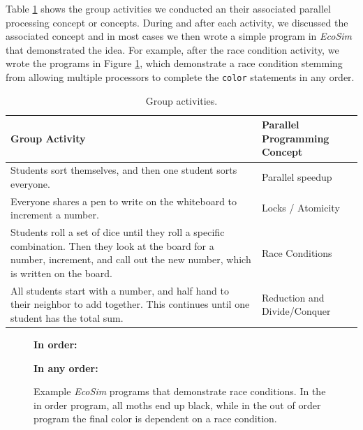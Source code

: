 \documentclass{sig-alternate}
\newcommand{\INDSTATE}[1][1]{\STATE\hspace{#1\algorithmicindent}}
\begin{document}
Table \ref{tab:group-activities} shows the group activities we conducted an their associated
parallel processing concept or concepts.  During and after each activity, we discussed the
associated concept and in most cases we then wrote a simple program in \emph{EcoSim} that
demonstrated the idea.
For example, after the race condition activity, we wrote the programs in Figure 
\ref{fig:race-conditions}, which demonstrate a race condition stemming from allowing multiple
processors to complete the \texttt{color} statements in any order.

\begin{table}
\centering \begin{tabular}{p{11cm} | p{5cm}} 
\toprule
Group Activity               &  Parallel Programming Concept \\ \midrule
Students sort themselves, and then one student sorts everyone.     & Parallel speedup \\ \hline
Everyone shares a pen to write on the whiteboard to increment a number. & Locks / Atomicity  \\ \hline
Students roll a set of dice until they roll a specific combination.  Then they
look at the board for a number, increment, and call out the new number, which is
written on the board.  & Race Conditions \\ \hline
All students start with a number, and half hand to their neighbor to add together.
This continues until one student has the total sum. & Reduction and Divide/Conquer  \\
\bottomrule 
\end{tabular}
\caption{Group activities.}
\label{tab:group-activities}
\end{table} 
     
\begin{figure}
\begin{algorithmic}[1]
\item[{\bf In order:}]
  \INDSTATE{a position}
  \INDSTATE{a color}
\STATE{}
  \INDSTATE{do in order}
  \INDSTATE[2]{replace the moth's color with gray}
  \INDSTATE[2]{replace the moth's color with black}
\end{algorithmic}

\begin{algorithmic}[1]
\item[{\bf In any order:}]
  \INDSTATE{a position}
  \INDSTATE{a color}
\STATE{}
  \INDSTATE{do in any order}
  \INDSTATE[2]{replace the moth's color with gray}
  \INDSTATE[2]{replace the moth's color with black}
\end{algorithmic} 
\caption{Example \emph{EcoSim} programs that demonstrate race conditions.  In the
in order program, all moths end up black, while in the out of order program
the final color is dependent on a race condition.}
\label{fig:race-conditions} 
\end{figure}
\end{document}
